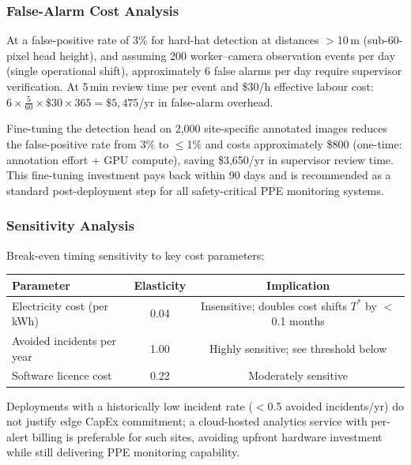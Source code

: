 \documentclass[11pt,a4paper]{article}
\begin{document}
\subsubsection*{False-Alarm Cost Analysis}

At a false-positive rate of 3\% for hard-hat detection at distances
$>$10\,m (sub-60-pixel head height), and assuming 200 worker--camera
observation events per day (single operational shift), approximately
6 false alarms per day require supervisor verification. At 5\,min
review time per event and \$30/h effective labour cost:
$6 \times \frac{5}{60} \times \$30 \times 365 = \$5{,}475$/yr
in false-alarm overhead.

Fine-tuning the detection head on 2,000 site-specific annotated
images reduces the false-positive rate from 3\% to $\leq$1\% and
costs approximately \$800 (one-time: annotation effort + GPU compute),
saving \$3,650/yr in supervisor review time. This fine-tuning
investment pays back within 90 days and is recommended as a standard
post-deployment step for all safety-critical PPE monitoring systems.

\subsubsection*{Sensitivity Analysis}

Break-even timing sensitivity to key cost parameters:

\begin{center}
\begin{tabular}{lcc}
  \toprule
  \textbf{Parameter} & \textbf{Elasticity} & \textbf{Implication} \\
  \midrule
  Electricity cost (per kWh) & 0.04 & Insensitive; doubles cost shifts $T^*$ by $<$0.1 months \\
  Avoided incidents per year & 1.00 & Highly sensitive; see threshold below \\
  Software licence cost & 0.22 & Moderately sensitive \\
  \bottomrule
\end{tabular}
\end{center}

\noindent Deployments with a historically low incident rate
($<$0.5 avoided incidents/yr) do not justify edge CapEx commitment;
a cloud-hosted analytics service with per-alert billing is preferable
for such sites, avoiding upfront hardware investment while still
delivering PPE monitoring capability.

\end{document}
